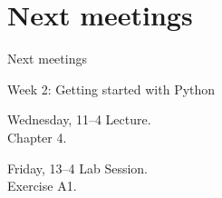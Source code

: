 \documentclass{beamer}
\begin{document}
\section{Next meetings}
\begin{frame}{}
Next meetings
\end{frame}


\begin{frame}{Week 2: Getting started with Python}

\begin{block}{Wednesday, 11--4}
Lecture.
\\Chapter 4.
\end{block}


\begin{block}{Friday, 13--4}
Lab Session.
\\ Exercise A1.
\end{block}



\end{frame}
\end{document}
